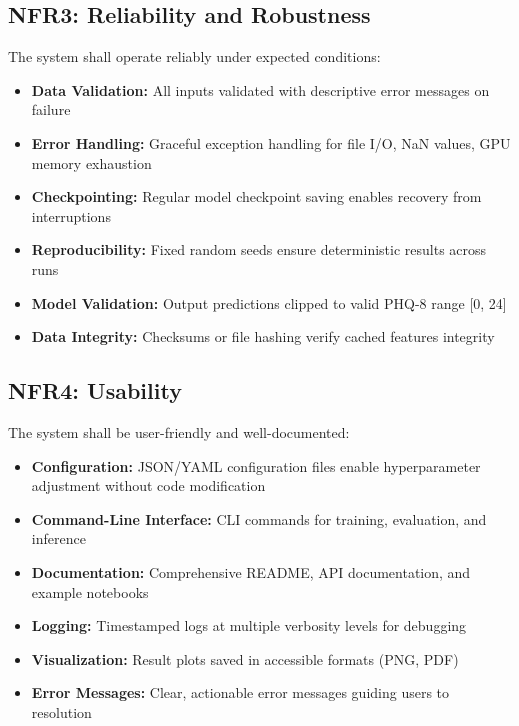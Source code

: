 \documentclass[12pt]{article}
\begin{document}
	\subsection{NFR3: Reliability and Robustness}

	The system shall operate reliably under expected conditions:

	\begin{itemize}
		\item \textbf{Data Validation:} All inputs validated with descriptive error messages on failure
		\item \textbf{Error Handling:} Graceful exception handling for file I/O, NaN values, GPU memory exhaustion
		\item \textbf{Checkpointing:} Regular model checkpoint saving enables recovery from interruptions
		\item \textbf{Reproducibility:} Fixed random seeds ensure deterministic results across runs
		\item \textbf{Model Validation:} Output predictions clipped to valid PHQ-8 range [0, 24]
		\item \textbf{Data Integrity:} Checksums or file hashing verify cached features integrity
	\end{itemize}

	\subsection{NFR4: Usability}

	The system shall be user-friendly and well-documented:

	\begin{itemize}
		\item \textbf{Configuration:} JSON/YAML configuration files enable hyperparameter adjustment without code modification
		\item \textbf{Command-Line Interface:} CLI commands for training, evaluation, and inference
		\item \textbf{Documentation:} Comprehensive README, API documentation, and example notebooks
		\item \textbf{Logging:} Timestamped logs at multiple verbosity levels for debugging
		\item \textbf{Visualization:} Result plots saved in accessible formats (PNG, PDF)
		\item \textbf{Error Messages:} Clear, actionable error messages guiding users to resolution
	\end{itemize}
\end{document}
